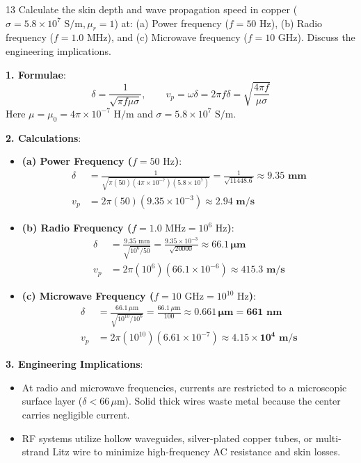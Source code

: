 \begin{theoryq}{13}
Calculate the skin depth and wave propagation speed in copper ($\sigma = 5.8 \times 10^7\text{ S/m}, \mu_r = 1$) at: (a) Power frequency ($f = 50\text{ Hz}$), (b) Radio frequency ($f = 1.0\text{ MHz}$), and (c) Microwave frequency ($f = 10\text{ GHz}$). Discuss the engineering implications.
\end{theoryq}
\begin{theorysol}
\textbf{1. Formulae}:
\begin{equation}
\delta = \frac{1}{\sqrt{\pi f \mu \sigma}}, \qquad v_p = \omega \delta = 2\pi f \delta = \sqrt{\frac{4\pi f}{\mu \sigma}}
\end{equation}
Here $\mu = \mu_0 = 4\pi \times 10^{-7}\text{ H/m}$ and $\sigma = 5.8 \times 10^7\text{ S/m}$.

\textbf{2. Calculations}:
\begin{itemize}
    \item \textbf{(a) Power Frequency ($f = 50\text{ Hz}$)}:
    \begin{align*}
    \delta &= \frac{1}{\sqrt{\pi (50)(4\pi\times 10^{-7})(5.8\times 10^7)}} = \frac{1}{\sqrt{11448.6}} \approx \mathbf{9.35\text{ mm}} \\
    v_p &= 2\pi (50)(9.35 \times 10^{-3}) \approx \mathbf{2.94\text{ m/s}}
    \end{align*}
    \item \textbf{(b) Radio Frequency ($f = 1.0\text{ MHz} = 10^6\text{ Hz}$)}:
    \begin{align*}
    \delta &= \frac{9.35\text{ mm}}{\sqrt{10^6 / 50}} = \frac{9.35 \times 10^{-3}}{\sqrt{20000}} \approx \mathbf{66.1\,\mu\text{m}} \\
    v_p &= 2\pi (10^6)(66.1 \times 10^{-6}) \approx \mathbf{415.3\text{ m/s}}
    \end{align*}
    \item \textbf{(c) Microwave Frequency ($f = 10\text{ GHz} = 10^{10}\text{ Hz}$)}:
    \begin{align*}
    \delta &= \frac{66.1\,\mu\text{m}}{\sqrt{10^{10}/10^6}} = \frac{66.1\,\mu\text{m}}{100} \approx \mathbf{0.661\,\mu\text{m} = 661\text{ nm}} \\
    v_p &= 2\pi (10^{10})(6.61 \times 10^{-7}) \approx \mathbf{4.15 \times 10^4\text{ m/s}}
    \end{align*}
\end{itemize}

\textbf{3. Engineering Implications}:
\begin{itemize}
    \item At radio and microwave frequencies, currents are restricted to a microscopic surface layer ($\delta < 66\,\mu\text{m}$). Solid thick wires waste metal because the center carries negligible current.
    \item RF systems utilize hollow waveguides, silver-plated copper tubes, or multi-strand Litz wire to minimize high-frequency AC resistance and skin losses.
\end{itemize}
\end{theorysol}
\vspace{4mm}

